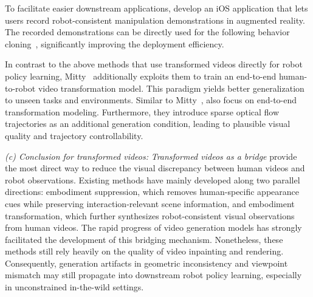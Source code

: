 \documentclass[Afour,sageh,times]{sagej}
\begin{document}
To facilitate easier downstream applications, \cite{duan2023ar2} develop an iOS application that lets users record robot-consistent manipulation demonstrations in augmented reality. The recorded demonstrations can be directly used for the following behavior cloning~\citep{shridhar2023perceiver}, significantly improving the deployment efficiency.


In contrast to the above methods that use transformed videos directly for robot policy learning, Mitty~\citep{song2025mitty} additionally exploits them to train an end-to-end human-to-robot video transformation model. This paradigm yields better generalization to unseen tasks and environments. Similar to Mitty~\citep{song2025mitty}, \cite{tang2025trajectory} also focus on end-to-end transformation modeling. Furthermore, they introduce sparse optical flow trajectories as an additional generation condition, leading to plausible visual quality and trajectory controllability. 

\textit{(c) Conclusion for transformed videos:} \textit{Transformed videos as a bridge} provide the most direct way to reduce the visual discrepancy between human videos and robot observations. Existing methods have mainly developed along two parallel directions: embodiment suppression, which removes human-specific appearance cues while preserving interaction-relevant scene information, and embodiment transformation, which further synthesizes robot-consistent visual observations from human videos. The rapid progress of video generation models has strongly facilitated the development of this bridging mechanism. Nonetheless, these methods still rely heavily on the quality of video inpainting and rendering. Consequently, generation artifacts in geometric inconsistency and viewpoint mismatch may still propagate into downstream robot policy learning, especially in unconstrained in-the-wild settings.
\end{document}
